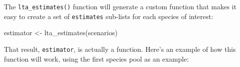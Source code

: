 \documentclass[
]{book}
\newenvironment{Shaded}{\begin{snugshade}}{\end{snugshade}}
\newcommand{\AttributeTok}[1]{\textcolor[rgb]{0.77,0.63,0.00}{#1}}
\newcommand{\DecValTok}[1]{\textcolor[rgb]{0.00,0.00,0.81}{#1}}
\newcommand{\FunctionTok}[1]{\textcolor[rgb]{0.00,0.00,0.00}{#1}}
\newcommand{\NormalTok}[1]{#1}
\newcommand{\OtherTok}[1]{\textcolor[rgb]{0.56,0.35,0.01}{#1}}
\newcommand{\SpecialCharTok}[1]{\textcolor[rgb]{0.00,0.00,0.00}{#1}}
\newcommand{\StringTok}[1]{\textcolor[rgb]{0.31,0.60,0.02}{#1}}
\begin{document}
The \texttt{lta\_estimates()} function will generate a custom function that makes it easy to create a set of \texttt{estimates} sub-lists for each species of interest:

\begin{Shaded}
\begin{Highlighting}[]
\NormalTok{estimator }\OtherTok{\textless{}{-}} \FunctionTok{lta\_estimates}\NormalTok{(scenarios)}
\end{Highlighting}
\end{Shaded}

That result, \texttt{estimator}, is actually a function. Here's an example of how this function will work, using the first species pool as an example:

\begin{Shaded}
\end{Shaded}
\end{document}
